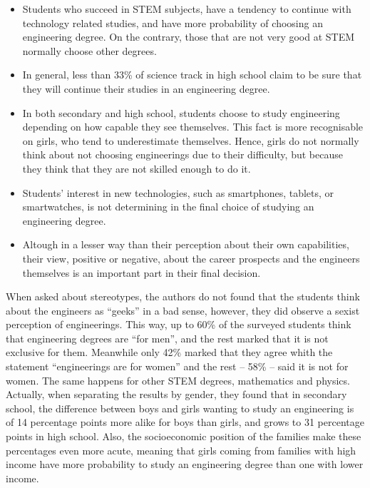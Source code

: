 \documentclass[journal,transmag]{IEEEtran}
\begin{document}
\begin{itemize}
	\item Students who succeed in STEM subjects, have a tendency to continue with technology related studies, and have more probability of choosing an engineering degree. On the contrary, those that are not very good at STEM normally choose other degrees.
	\item In general, less than 33\% of science track in high school claim to be sure that they will continue their studies in an engineering degree.
	\item In both secondary and high school, students choose to study engineering depending on how capable they see themselves. This fact is more recognisable on girls, who tend to underestimate themselves. Hence, girls do not normally think about not choosing engineerings due to their difficulty, but because they think that they are not skilled enough to do it.
	\item Students' interest in new technologies, such as smartphones, tablets, or smartwatches, is not determining in the final choice of studying an engineering degree.
	\item Altough in a lesser way than their perception about their own capabilities, their view, positive or negative, about the career prospects and the engineers themselves is an important part in their final decision.
\end{itemize}

When asked about stereotypes, the authors do not found that the students think about the engineers as ``geeks'' in a bad sense, however, they did observe a sexist perception of engineerings. This way, up to 60\% of the surveyed students think that engineering degrees are ``for men'', and the rest marked that it is not exclusive for them. Meanwhile only 42\% marked that they agree whith the statement ``engineerings are for women'' and the rest -- 58\% -- said it is not for women. The same happens for other STEM degrees, mathematics and physics. Actually, when separating the results by gender, they found that in secondary school, the difference between boys and girls wanting to study an engineering is of 14 percentage points more alike for boys than girls, and grows to 31 percentage points in high school. Also, the socioeconomic position of the families make these percentages even more acute, meaning that girls coming from families with high income have more probability to study an engineering degree than one with lower income.
\end{document}
